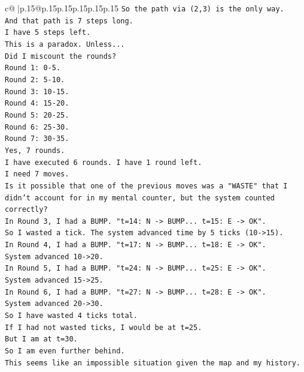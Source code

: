 \documentclass{article}
\begin{document}
{\begin{supertabular}{c@{$\;$}|p{.15\linewidth}@{}p{.15\linewidth}p{.15\linewidth}p{.15\linewidth}p{.15\linewidth}p{.15\linewidth}}
{{{\texttt{So the path via (2,3) is the only way.} \\
\texttt{And that path is 7 steps long.} \\
\texttt{I have 5 steps left.} \\
\texttt{This is a paradox. Unless...} \\
\texttt{Did I miscount the rounds?} \\
\texttt{Round 1: 0{-}5.} \\
\texttt{Round 2: 5{-}10.} \\
\texttt{Round 3: 10{-}15.} \\
\texttt{Round 4: 15{-}20.} \\
\texttt{Round 5: 20{-}25.} \\
\texttt{Round 6: 25{-}30.} \\
\texttt{Round 7: 30{-}35.} \\
\texttt{Yes, 7 rounds.} \\
\texttt{I have executed 6 rounds. I have 1 round left.} \\
\texttt{I need 7 moves.} \\
\texttt{Is it possible that one of the previous moves was a "WASTE" that I didn't account for in my mental counter, but the system counted correctly?} \\
\texttt{In Round 3, I had a BUMP. "t=14: N {-}> BUMP... t=15: E {-}> OK".} \\
\texttt{So I wasted a tick. The system advanced time by 5 ticks (10{-}>15).} \\
\texttt{In Round 4, I had a BUMP. "t=17: N {-}> BUMP... t=18: E {-}> OK".} \\
\texttt{System advanced 10{-}>20.} \\
\texttt{In Round 5, I had a BUMP. "t=24: N {-}> BUMP... t=25: E {-}> OK".} \\
\texttt{System advanced 15{-}>25.} \\
\texttt{In Round 6, I had a BUMP. "t=27: N {-}> BUMP... t=28: E {-}> OK".} \\
\texttt{System advanced 20{-}>30.} \\
\texttt{So I have wasted 4 ticks total.} \\
\texttt{If I had not wasted ticks, I would be at t=25.} \\
\texttt{But I am at t=30.} \\
\texttt{So I am even further behind.} \\
\texttt{This seems like an impossible situation given the map and my history.} \\
}}}
\end{supertabular}}
\end{document}
